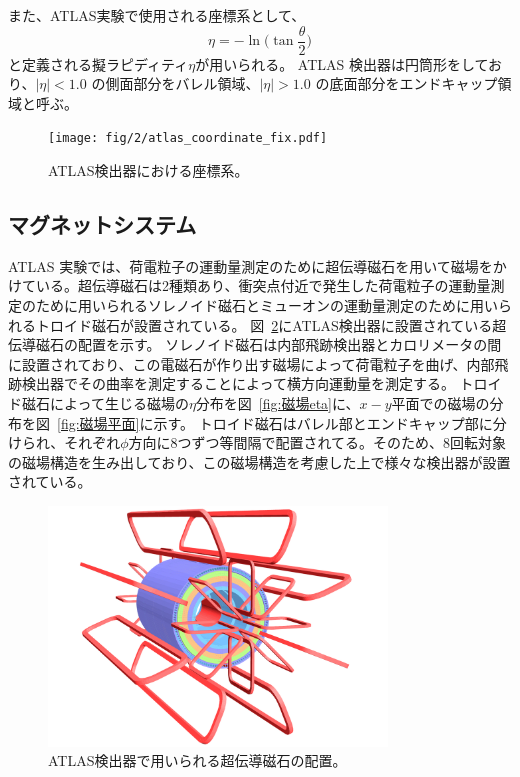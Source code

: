 また、ATLAS実験で使用される座標系として、
\begin{equation}
　\eta=-\ln\bigg(\tan\frac{\theta}{2}\bigg)
　\label{ラピディティ}
\end{equation}
と定義される擬ラピディティ$\eta$が用いられる。
ATLAS 検出器は円筒形をしており、$|\eta| < 1.0$ の側面部分をバレル領域、$|\eta| > 1.0$ の底面部分をエンドキャップ領域と呼ぶ。

\begin{figure}[tb]
  \centering
  \texttt{[image: fig/2/atlas\_coordinate\_fix.pdf]}
  \caption{ATLAS検出器における座標系。}
  \label{fig:a}
\end{figure}

\newpage
\subsection{マグネットシステム}\label{magnetic_filed}
ATLAS 実験では、荷電粒子の運動量測定のために超伝導磁石を用いて磁場をかけている。超伝導磁石は2種類あり、衝突点付近で発生した荷電粒子の運動量測定のために用いられるソレノイド磁石とミューオンの運動量測定のために用いられるトロイド磁石が設置されている。
図~\ref{fig:磁石}にATLAS検出器に設置されている超伝導磁石の配置を示す。
ソレノイド磁石は内部飛跡検出器とカロリメータの間に設置されており、この電磁石が作り出す磁場によって荷電粒子を曲げ、内部飛跡検出器でその曲率を測定することによって横方向運動量を測定する。
トロイド磁石によって生じる磁場の$\eta$分布を図~\ref{fig:磁場eta}に、$x-y$平面での磁場の分布を図~\ref{fig:磁場平面}に示す。
トロイド磁石はバレル部とエンドキャップ部に分けられ、それぞれ$\phi$方向に8つずつ等間隔で配置されてる。そのため、8回転対象の磁場構造を生み出しており、この磁場構造を考慮した上で様々な検出器が設置されている。



\begin{figure}[tb]
  \centering
  \includegraphics[clip, width=9cm]{fig/2/ATLcoilGeom.pdf}
  \caption{ATLAS検出器で用いられる超伝導磁石の配置\cite{Aad:1129811}。}
  \label{fig:磁石}
\end{figure}


